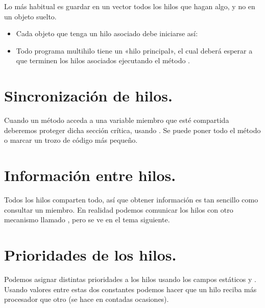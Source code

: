\documentclass[letterpaper,10pt,spanish]{sphinxmanual}
\begin{document}
%
\begin{sphinxVerbatim}[commandchars=\\\{\}]
  
\end{sphinxVerbatim}

Lo más habitual es guardar en un vector todos los hilos que hagan algo, y no en un objeto suelto.
\begin{itemize}
\item {} 
Cada objeto que tenga un hilo asociado debe iniciarse así:

\end{itemize}

%
\begin{sphinxVerbatim}[commandchars=\\\{\}]
\end{sphinxVerbatim}
\begin{itemize}
\item {} 
Todo programa multihilo tiene un «hilo principal», el cual deberá esperar a que terminen los hilos asociados ejecutando el método   .

\end{itemize}


\section{Sincronización de hilos.}
\label{\detokenize{textos/tema2:sincronizacion-de-hilos}}
Cuando un método acceda a una variable miembro que esté compartida deberemos proteger dicha sección crítica, usando . Se puede poner todo el método  o marcar un trozo de código más pequeño.


\section{Información entre hilos.}
\label{\detokenize{textos/tema2:informacion-entre-hilos}}
Todos los hilos comparten todo, así que obtener información es tan sencillo como consultar un miembro.
En realidad podemos comunicar los hilos con otro mecanismo llamado , pero se ve en el tema siguiente.


\section{Prioridades de los hilos.}
\label{\detokenize{textos/tema2:prioridades-de-los-hilos}}
Podemos asignar distintas prioridades a los hilos usando los campos estáticos  y . Usando valores entre estas dos constantes podemos hacer que un hilo reciba más procesador que otro (se hace en contadas ocasiones).
\end{document}
